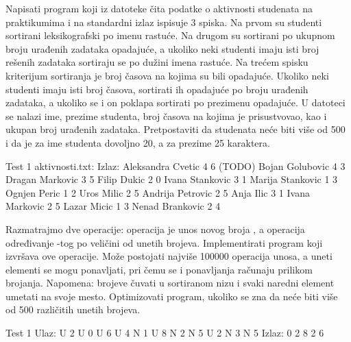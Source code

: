 \begin{Exercise}[label=513]
   Napisati program koji iz datoteke  čita
   podatke o aktivnosti studenata na praktikumima i na standardni
   izlaz ispisuje 3 spiska. Na prvom su studenti sortirani
   leksikografski po imenu rastuće. Na drugom su sortirani po ukupnom
   broju urađenih zadataka opadajuće, a ukoliko neki studenti imaju
   isti broj rešenih zadataka sortiraju se po dužini imena rastuće. Na
   trećem spisku kriterijum sortiranja je broj časova na kojima su
   bili opadajuće. Ukoliko neki studenti imaju isti broj časova,
   sortirati ih opadajuće po broju urađenih zadataka, a ukoliko se i
   on poklapa sortirati po prezimenu opadajuće. U datoteci se nalazi
   ime, prezime studenta, broj časova na kojima je prisustvovao, kao i
   ukupan broj urađenih zadataka. Pretpostaviti da studenata neće biti
   više od 500 i da je za ime studenta dovoljno 20, a za prezime 25
   karaktera.
  
\begin{miditest}
\begin{test}{Test 1}
aktivnosti.txt:               Izlaz:
Aleksandra Cvetic 4 6         (TODO)
Bojan Golubovic 4 3
Dragan Markovic 3 5
Filip Dukic 2 0 
Ivana Stankovic 3 1
Marija Stankovic 1 3 
Ognjen Peric 1 2
Uros Milic 2 5
Andrija Petrovic 2 5
Anja Ilic 3 1
Ivana Markovic 2 5
Lazar Micic 1 3
Nenad Brankovic 2 4
\end{test}
\end{miditest}
  
\end{Exercise}

\begin{Exercise}[label=514]
  Razmatrajmo dve operacije: operacija  je unos novog broja
  , a operacija  određivanje -tog po
  veličini od unetih brojeva. Implementirati program koji izvršava ove
  operacije. Može postojati najviše 100000 operacija unosa, a uneti
  elementi se mogu ponavljati, pri čemu se i ponavljanja računaju
  prilikom brojanja. Napomena: brojeve čuvati u sortiranom nizu i
  svaki naredni element umetati na svoje mesto. Optimizovati program,
  ukoliko se zna da neće biti više od 500 različitih unetih brojeva.
  
\begin{maxitest}
\begin{test}{Test 1}
Ulaz: U 2 U 0 U 6 U 4 N 1 U 8 N 2 N 5 U 2 N 3 N 5
Izlaz: 0 2 8 2 6
\end{test}
\end{maxitest}
  
\end{Exercise}

